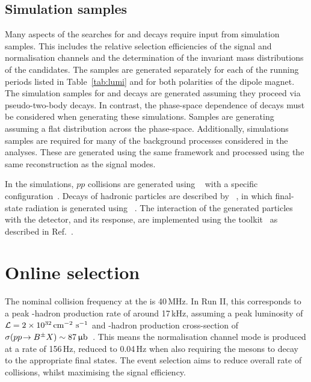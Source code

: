 \subsection{Simulation samples}
\label{sec:mc}

Many aspects of the searches for \decay{\Bp}{\Dsp\phiz} and \decay{\Bp}{\Dsp\Kp\Km} decays require input from simulation samples. This includes the relative selection efficiencies of the signal and normalisation channels and the determination of the invariant mass distributions of the candidates.
The samples are generated separately for each of the running periods listed in Table~\ref{tab:lumi} and for both polarities of the \lhcb dipole magnet. The simulation samples for \decay{\Bp}{\Dsp\phiz} and \decay{\Bp}{\Dsp\Dzb} decays are generated assuming they proceed via pseudo-two-body decays. In contrast, the phase-space dependence of \decay{\Bp}{\Dsp\Kp\Km} decays must be considered when generating these simulations. Samples are generating assuming a flat distribution across the phase-space. 
Additionally, simulations samples are required for many of the background processes considered in the analyses. These are generated using the same framework and processed using the same reconstruction as the signal modes.


In the simulations, $pp$ collisions are generated using \pythia~\cite{Sjostrand:2007gs,Sjostrand:2006za} with a specific \lhcb configuration~\cite{LHCb-PROC-2010-056}.  Decays of hadronic particles are described by \evtgen~\cite{Lange:2001uf}, in which final-state radiation is generated using \photos~\cite{Golonka:2005pn}. The interaction of the generated particles with the detector, and its response, are implemented using the \geant toolkit~\cite{Allison:2006ve, *Agostinelli:2002hh} as described in Ref.~\cite{LHCb-PROC-2011-006}.


\section{Online selection}
\label{sec:selection_trigger}

The nominal collision frequency at the \lhc is 40\,MHz. In Run II, this corresponds to a peak \Bpm-hadron production rate of around 17\,kHz, assuming a peak luminosity of $\mathcal{L} = 2\times10^{32}\mathrm{ \,cm}^{-2}\,\mathrm{{\,s}}^{-1}$ and \Bpm-hadron production cross-section of $\sigma({p}{p}\!\rightarrow {\ensuremath{{B}^\pm}} X) \sim 87{\mathrm{ \,\upmu b}}$~\cite{LHCb-PAPER-2017-037}. 
This means the normalisation channel mode \decay{\Bp}{\Dsp\Dzb} is produced at a rate of 156\,Hz, reduced to 0.04\,Hz when also requiring the \D mesons to decay to the appropriate final states.
The event selection aims to reduce overall rate of collisions, whilst maximising the signal efficiency. 

